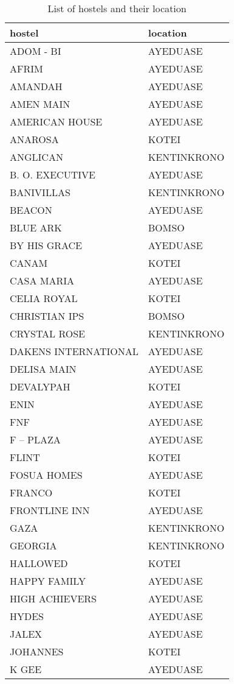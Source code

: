 \begin{longtable}{p{6.5cm}p{6.5cm}}
	\caption{List of hostels and their location}
	\label{table:2} \\
	\hline
	\textbf{hostel} & \textbf{location} \\
	\hline
	ADOM - BI & AYEDUASE \\
	AFRIM &	AYEDUASE \\
	AMANDAH & AYEDUASE \\
	AMEN MAIN & AYEDUASE \\
	AMERICAN HOUSE & AYEDUASE \\
	ANAROSA & KOTEI \\
	ANGLICAN & KENTINKRONO \\
	B. O. EXECUTIVE & AYEDUASE \\
	BANIVILLAS & KENTINKRONO \\
	BEACON & AYEDUASE \\
	BLUE ARK & BOMSO \\
	BY HIS GRACE & AYEDUASE \\
	CANAM & KOTEI \\
	CASA MARIA & AYEDUASE \\
	CELIA ROYAL & KOTEI \\
	CHRISTIAN IPS & BOMSO \\
	CRYSTAL ROSE & KENTINKRONO \\
	DAKENS INTERNATIONAL & AYEDUASE \\
	DELISA MAIN & AYEDUASE \\
	DEVALYPAH & KOTEI \\
	ENIN & AYEDUASE \\
	FNF & AYEDUASE \\
	F – PLAZA & AYEDUASE \\
	FLINT & KOTEI \\
	FOSUA HOMES & AYEDUASE \\ 
	FRANCO & KOTEI \\
	FRONTLINE INN & AYEDUASE \\
	GAZA & KENTINKRONO \\
	GEORGIA & KENTINKRONO \\
	HALLOWED & KOTEI \\
	HAPPY FAMILY & AYEDUASE \\
	HIGH ACHIEVERS & AYEDUASE \\
	HYDES & AYEDUASE \\ 
	JALEX & AYEDUASE \\
	JOHANNES & KOTEI \\
	K GEE & AYEDUASE \\

\end{longtable}
